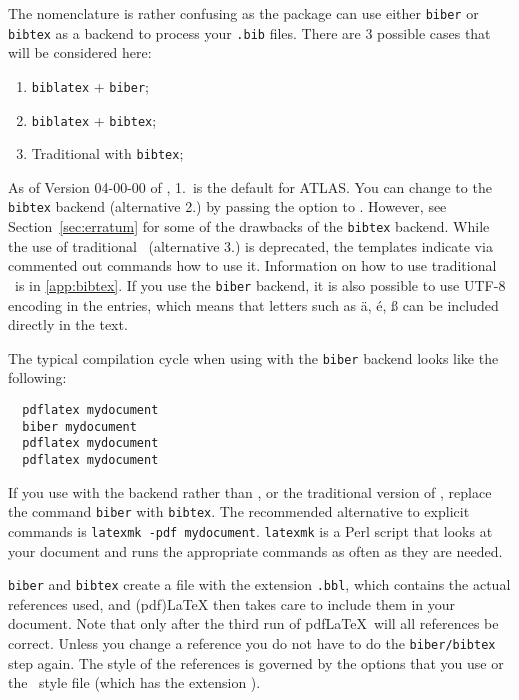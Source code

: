 \documentclass[UKenglish, texlive=2016]{\ATLASLATEXPATH atlasdoc}
\begin{document}
The nomenclature is rather confusing as the package  can use
either \texttt{biber} or \texttt{bibtex} as a backend to process your \texttt{.bib} files.
There are 3 possible cases that will be considered here:
\begin{enumerate}\setlength{\itemsep}{0pt}\setlength{\parskip}{0pt}
  \item \texttt{biblatex} + \texttt{biber};
  \item \texttt{biblatex} + \texttt{bibtex};
  \item Traditional \BibTeX with \texttt{bibtex};
\end{enumerate}
As of Version 04-00-00 of , 1.\ is the default for ATLAS\@.
You can change to the \texttt{bibtex} backend (alternative 2.) by passing the option
 to .
However, see Section~\ref{sec:erratum} for some of the drawbacks of the \texttt{bibtex} backend.
While the use of traditional \BibTeX\ (alternative 3.) is deprecated,
the templates indicate via commented out commands how to use it.
Information on how to use traditional \BibTeX\ is in \cref{app:bibtex}.
If you use the \texttt{biber} backend, it is also possible to use UTF-8 encoding in the entries, which means that letters such as
ä, é, ß can be included directly in the text.

The typical compilation cycle when using  with the \texttt{biber} backend
looks like the following:
%
\begin{verbatim}
  pdflatex mydocument
  biber mydocument
  pdflatex mydocument
  pdflatex mydocument
\end{verbatim}
If you use  with the backend  rather than ,
or the traditional version of \BibTeX{},
replace the command \texttt{biber} with \texttt{bibtex}.
The recommended alternative to explicit commands is \texttt{latexmk -pdf mydocument}.
\texttt{latexmk} is a Perl script that looks at your document and runs the appropriate
commands as often as they are needed.

\texttt{biber} and \texttt{bibtex} create a file with the extension \texttt{.bbl}, which
contains the actual references used, and (pdf)\LaTeX{} then takes care to include them in your document.
Note that only after the third run of pdf\LaTeX\ will all references be correct.
Unless you change a reference you do not have to do the \texttt{biber/bibtex} step again.
The style of the references is governed by the  options that you
use or the \BibTeX\ style file (which has the extension ).
\end{document}
